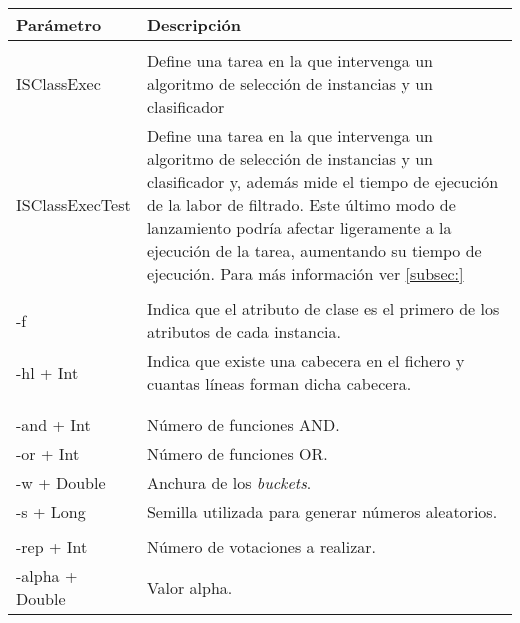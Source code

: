  \begin{table}
  \begin{center}
   \begin{tabular}{| m{3cm} | L{9cm} |}
    \hline
    \centering Parámetro &  Descripción \\
    \hline
     \\
    \hline
   	\centering ISClassExec & Define una tarea en la que intervenga un algoritmo de selección de instancias y un clasificador \\
   	\hline
   	\centering ISClassExecTest & Define una tarea en la que intervenga un algoritmo de selección de instancias y un clasificador y, además mide el tiempo de ejecución de la labor de filtrado. Este último modo de lanzamiento podría afectar ligeramente a la ejecución de la tarea, aumentando su tiempo de ejecución. Para más información ver \ref{subsec:}\\
   	\hline
   	 \\
   	\hline
   	\centering -f & Indica que el atributo de clase es el primero de los atributos de cada instancia.\\
   	\hline
   	\centering -hl + Int & Indica que existe una cabecera en el fichero y cuantas líneas forman dicha cabecera. \\
   	\hline
   	 \\
   	\hline
   	 \\
   	\hline
   	\centering -and + Int & Número de funciones AND.\\
   	\hline
   	\centering -or + Int & Número de funciones OR.\\
   	\hline
   	\centering -w + Double & Anchura de los \textit{buckets}.\\
   	\hline
   	\centering -s + Long & Semilla utilizada para generar números aleatorios.\\
   	\hline
   	 \\
   	\hline
   	\centering -rep + Int & Número de votaciones a realizar.\\
   	\hline
   	\centering -alpha +  Double & Valor alpha.\\

\end{tabular}
\end{center}
\end{table}
